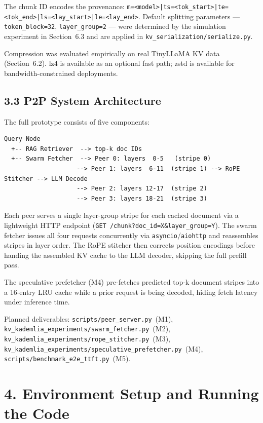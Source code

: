 \documentclass[11pt]{article}
\begin{document}
The chunk ID encodes the provenance:
\texttt{m=<model>|ts=<tok\_start>|te=<tok\_end>|ls=<lay\_start>|le=<lay\_end>}.
Default splitting parameters --- \texttt{token\_block=32},
\texttt{layer\_group=2} --- were determined by the simulation experiment
in Section~6.3 and are applied in \texttt{kv\_serialization/serialize.py}.

Compression was evaluated empirically on real TinyLLaMA KV data
(Section~6.2). lz4 is available as an optional fast path; zstd is
available for bandwidth-constrained deployments.

\subsection{3.3 P2P System Architecture}

The full prototype consists of five components:

\begin{verbatim}
Query Node
  +-- RAG Retriever  --> top-k doc IDs
  +-- Swarm Fetcher  --> Peer 0: layers  0-5   (stripe 0)
                    --> Peer 1: layers  6-11  (stripe 1) --> RoPE Stitcher --> LLM Decode
                    --> Peer 2: layers 12-17  (stripe 2)
                    --> Peer 3: layers 18-21  (stripe 3)
\end{verbatim}

Each peer serves a single layer-group stripe for each cached document
via a lightweight HTTP endpoint
(\texttt{GET /chunk?doc\_id=X\&layer\_group=Y}). The swarm fetcher
issues all four requests concurrently via \texttt{asyncio}/\texttt{aiohttp}
and reassembles stripes in layer order. The RoPE stitcher then corrects
position encodings before handing the assembled KV cache to the LLM
decoder, skipping the full prefill pass.

The speculative prefetcher (M4) pre-fetches predicted top-k document
stripes into a 16-entry LRU cache while a prior request is being
decoded, hiding fetch latency under inference time.

Planned deliverables: \texttt{scripts/peer\_server.py}~(M1),
\texttt{kv\_kademlia\_experiments/swarm\_fetcher.py}~(M2),
\texttt{kv\_kademlia\_experiments/rope\_stitcher.py}~(M3),
\texttt{kv\_kademlia\_experiments/speculative\_prefetcher.py}~(M4),
\texttt{scripts/benchmark\_e2e\_ttft.py}~(M5).

\section{4. Environment Setup and Running the Code}
\end{document}
